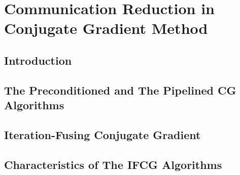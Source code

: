 
\chapter{Communication Reduction in Conjugate Gradient Method}
\label{chap:ifcg}

\newcommand{\MAXPERF}{42\%}
\newcommand{\AVERAGEPERF}{13\%}
\newcommand{\MAXLOC}{81\%}
\newcommand{\AVERAGELOC}{28\%}

\section{Introduction}

\section{The Preconditioned and The Pipelined CG Algorithms}
\label{sec:ifcg_existingCG}

\section{Iteration-Fusing Conjugate Gradient}
\label{sec:ifcg_ifcg}

\section{Characteristics of The IFCG Algorithms}
\label{sec:ifcg_characteristics}


